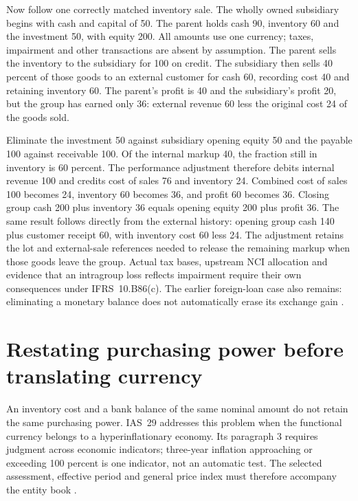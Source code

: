 Now follow one correctly matched inventory sale. The wholly owned subsidiary
begins with cash and capital of 50. The parent holds cash 90, inventory 60 and
the investment 50, with equity 200. All amounts use one currency; taxes,
impairment and other transactions are absent by assumption. The parent sells
the inventory to the subsidiary for 100 on credit. The subsidiary then sells
40 percent of those goods to an external customer for cash 60, recording
cost 40 and retaining inventory 60. The parent's profit is 40 and the
subsidiary's profit 20, but the group has earned only 36: external revenue 60
less the original cost 24 of the goods sold.

Eliminate the investment 50 against subsidiary opening equity 50 and the
payable 100 against receivable 100. Of the internal markup 40, the fraction
still in inventory is 60 percent. The performance adjustment therefore debits
internal revenue 100 and credits cost of sales 76 and inventory 24. Combined
cost of sales 100 becomes 24, inventory 60 becomes 36, and profit 60 becomes 36.
Closing group cash 200 plus inventory 36 equals opening equity 200 plus
profit 36. The same result follows directly from the external history:
opening group cash 140 plus customer receipt 60, with inventory cost 60 less 24.
The adjustment retains the lot and external-sale references needed to release
the remaining markup when those goods leave the group. Actual tax bases,
upstream NCI allocation and evidence that an intragroup loss reflects impairment
require their own consequences under IFRS~10.B86(c). The earlier foreign-loan
case also remains: eliminating a monetary balance does not automatically erase
its exchange gain \citep[IFRS~10.B86(c); IAS~21.45]{eu20231803}.

\section{Restating purchasing power before translating currency}
\label{sec:group-hyperinflation}

An inventory cost and a bank balance of the same nominal amount do not retain
the same purchasing power. IAS~29 addresses this problem when the functional
currency belongs to a hyperinflationary economy. Its paragraph 3 requires
judgment across economic indicators; three-year inflation approaching or
exceeding 100 percent is one indicator, not an automatic test. The selected
assessment, effective period and general price index must therefore accompany
the entity book \citep[IAS~29.1--4, 8--19, 24--28, 37--39]{eu20231803}.

